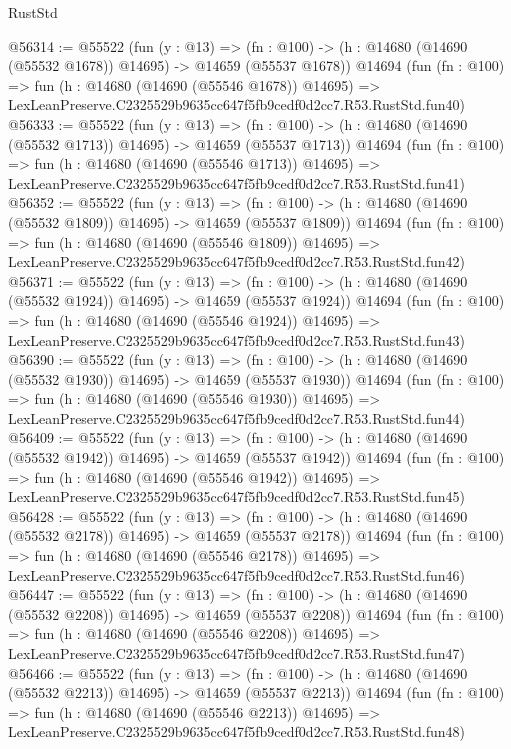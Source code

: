 \begin{lexlean}{RustStd}
\begin{coremodule}
@56314 := @55522
    (fun (y : @13) =>
    (fn : @100) -> (h : @14680 (@14690 (@55532 @1678)) @14695) -> @14659 (@55537 @1678))
    @14694
    (fun (fn : @100) =>
    fun (h : @14680 (@14690 (@55546 @1678)) @14695) =>
    LexLeanPreserve.C2325529b9635cc647f5fb9cedf0d2cc7.R53.RustStd.fun40)
@56333 := @55522
    (fun (y : @13) =>
    (fn : @100) -> (h : @14680 (@14690 (@55532 @1713)) @14695) -> @14659 (@55537 @1713))
    @14694
    (fun (fn : @100) =>
    fun (h : @14680 (@14690 (@55546 @1713)) @14695) =>
    LexLeanPreserve.C2325529b9635cc647f5fb9cedf0d2cc7.R53.RustStd.fun41)
@56352 := @55522
    (fun (y : @13) =>
    (fn : @100) -> (h : @14680 (@14690 (@55532 @1809)) @14695) -> @14659 (@55537 @1809))
    @14694
    (fun (fn : @100) =>
    fun (h : @14680 (@14690 (@55546 @1809)) @14695) =>
    LexLeanPreserve.C2325529b9635cc647f5fb9cedf0d2cc7.R53.RustStd.fun42)
@56371 := @55522
    (fun (y : @13) =>
    (fn : @100) -> (h : @14680 (@14690 (@55532 @1924)) @14695) -> @14659 (@55537 @1924))
    @14694
    (fun (fn : @100) =>
    fun (h : @14680 (@14690 (@55546 @1924)) @14695) =>
    LexLeanPreserve.C2325529b9635cc647f5fb9cedf0d2cc7.R53.RustStd.fun43)
@56390 := @55522
    (fun (y : @13) =>
    (fn : @100) -> (h : @14680 (@14690 (@55532 @1930)) @14695) -> @14659 (@55537 @1930))
    @14694
    (fun (fn : @100) =>
    fun (h : @14680 (@14690 (@55546 @1930)) @14695) =>
    LexLeanPreserve.C2325529b9635cc647f5fb9cedf0d2cc7.R53.RustStd.fun44)
@56409 := @55522
    (fun (y : @13) =>
    (fn : @100) -> (h : @14680 (@14690 (@55532 @1942)) @14695) -> @14659 (@55537 @1942))
    @14694
    (fun (fn : @100) =>
    fun (h : @14680 (@14690 (@55546 @1942)) @14695) =>
    LexLeanPreserve.C2325529b9635cc647f5fb9cedf0d2cc7.R53.RustStd.fun45)
@56428 := @55522
    (fun (y : @13) =>
    (fn : @100) -> (h : @14680 (@14690 (@55532 @2178)) @14695) -> @14659 (@55537 @2178))
    @14694
    (fun (fn : @100) =>
    fun (h : @14680 (@14690 (@55546 @2178)) @14695) =>
    LexLeanPreserve.C2325529b9635cc647f5fb9cedf0d2cc7.R53.RustStd.fun46)
@56447 := @55522
    (fun (y : @13) =>
    (fn : @100) -> (h : @14680 (@14690 (@55532 @2208)) @14695) -> @14659 (@55537 @2208))
    @14694
    (fun (fn : @100) =>
    fun (h : @14680 (@14690 (@55546 @2208)) @14695) =>
    LexLeanPreserve.C2325529b9635cc647f5fb9cedf0d2cc7.R53.RustStd.fun47)
@56466 := @55522
    (fun (y : @13) =>
    (fn : @100) -> (h : @14680 (@14690 (@55532 @2213)) @14695) -> @14659 (@55537 @2213))
    @14694
    (fun (fn : @100) =>
    fun (h : @14680 (@14690 (@55546 @2213)) @14695) =>
    LexLeanPreserve.C2325529b9635cc647f5fb9cedf0d2cc7.R53.RustStd.fun48)

\end{coremodule}
\end{lexlean}
